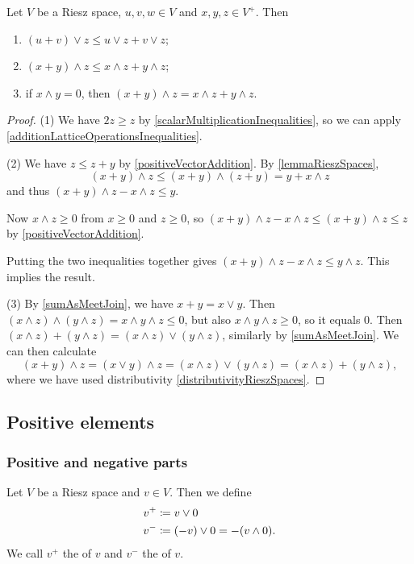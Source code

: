\begin{lemma} \label{additionLatticeOperationsPositiveElementsInequalities}
Let $V$ be a Riesz space, $u,v,w\in V$ and $x,y,z\in V^+$. Then
\begin{enumerate}
\item $(u+v)\vee z \leq u\vee z + v\vee z$;
\item $(x+y)\wedge z \leq x\wedge z + y\wedge z$;
\item if $x\wedge y = 0$, then $(x+y)\wedge z = x\wedge z + y\wedge z$.
\end{enumerate}
\end{lemma}
\begin{proof}
(1) We have $2z \geq z$ by \ref{scalarMultiplicationInequalities}, so we can apply \ref{additionLatticeOperationsInequalities}.

(2) We have $z \leq z+y$ by \ref{positiveVectorAddition}. By \ref{lemmaRieszSpaces},
\[ (x+y)\wedge z \leq (x+y)\wedge (z+y) = y + x\wedge z \]
and thus $(x+y)\wedge z - x\wedge z \leq y$. 

Now $x\wedge z \geq 0$ from $x\geq 0$ and $z\geq 0$, so $(x+y)\wedge z - x\wedge z \leq (x+y)\wedge z \leq z$ by \ref{positiveVectorAddition}.

Putting the two inequalities together gives $(x+y)\wedge z - x\wedge z \leq y\wedge z$. This implies the result.

(3) By \ref{sumAsMeetJoin}, we have $x+y = x\vee y$. Then $(x\wedge z)\wedge (y\wedge z) = x\wedge y \wedge z \leq 0$, but also $x\wedge y \wedge z \geq 0$, so it equals $0$. Then $(x\wedge z) + (y\wedge z) = (x\wedge z) \vee (y\wedge z)$, similarly by \ref{sumAsMeetJoin}. We can then calculate
\[ (x+y)\wedge z = (x\vee y)\wedge z = (x\wedge z)\vee (y\wedge z) = (x\wedge z) + (y\wedge z), \]
where we have used distributivity \ref{distributivityRieszSpaces}.
\end{proof}

\subsection{Positive elements}
\subsubsection{Positive and negative parts}
\begin{definition}
Let $V$ be a Riesz space and $v\in V$. Then we define
\begin{align*}
v^+ &\coloneqq v \vee 0 \\
v^- &\coloneqq (-v) \vee 0 = - (v \wedge 0).
\end{align*}
We call $v^+$ the  of $v$ and $v^-$ the  of $v$.
\end{definition}


